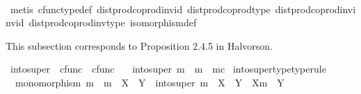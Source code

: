\begin{isabellebody}
%
\isadelimproof
\ \ %
\endisadelimproof
%
\isatagproof
{}\isamarkupfalse%
\ {\isacharparenleft}{\kern0pt}metis\ cfunc{\isacharunderscore}{\kern0pt}type{\isacharunderscore}{\kern0pt}def\ dist{\isacharunderscore}{\kern0pt}prod{\isacharunderscore}{\kern0pt}coprod{}{\isacharunderscore}{\kern0pt}inv{}{\isacharunderscore}{\kern0pt}id\ dist{\isacharunderscore}{\kern0pt}prod{\isacharunderscore}{\kern0pt}coprod{}{\isacharunderscore}{\kern0pt}type\ dist{\isacharunderscore}{\kern0pt}prod{\isacharunderscore}{\kern0pt}coprod{\isacharunderscore}{\kern0pt}inv{}{\isacharunderscore}{\kern0pt}inv{\isacharunderscore}{\kern0pt}id\ dist{\isacharunderscore}{\kern0pt}prod{\isacharunderscore}{\kern0pt}coprod{\isacharunderscore}{\kern0pt}inv{}{\isacharunderscore}{\kern0pt}type\ isomorphism{\isacharunderscore}{\kern0pt}def{\isacharparenright}{\kern0pt}%
\endisatagproof
{\isafoldproof}%
%
\isadelimproof
%
\endisadelimproof
%
\isadelimdocument
%
\endisadelimdocument
%
\isatagdocument
%
\isamarkuptrue%
%
\isamarkuptrue%
%
\endisatagdocument
{\isafolddocument}%
%
\isadelimdocument
%
\endisadelimdocument
%
\begin{isamarkuptext}%
This subsection corresponds to Proposition 2.4.5 in Halvorson.%
\end{isamarkuptext}\isamarkuptrue%
\isamarkupfalse%
\ into{\isacharunderscore}{\kern0pt}super\ {\isacharcolon}{\kern0pt}{\isacharcolon}{\kern0pt}\ {\isachardoublequoteopen}cfunc\ {\isasymRightarrow}\ cfunc{\isachardoublequoteclose}\ \isanewline
\ \ {\isachardoublequoteopen}into{\isacharunderscore}{\kern0pt}super\ m\ {\isacharequal}{\kern0pt}\ m\ {\isasymamalg}\ m\isactrlsup c{\isachardoublequoteclose}\isanewline
\isanewline
{}\isamarkupfalse%
\ into{\isacharunderscore}{\kern0pt}super{\isacharunderscore}{\kern0pt}type{\isacharbrackleft}{\kern0pt}type{\isacharunderscore}{\kern0pt}rule{\isacharbrackright}{\kern0pt}{\isacharcolon}{\kern0pt}\isanewline
\ \ {\isachardoublequoteopen}monomorphism\ m\ {\isasymLongrightarrow}\ m\ {\isacharcolon}{\kern0pt}\ X\ {\isasymrightarrow}\ Y\ {\isasymLongrightarrow}\ into{\isacharunderscore}{\kern0pt}super\ m\ {\isacharcolon}{\kern0pt}\ X\ {\isasymCoprod}\ {\isacharparenleft}{\kern0pt}Y\ {\isasymsetminus}\ {\isacharparenleft}{\kern0pt}X{\isacharcomma}{\kern0pt}m{\isacharparenright}{\kern0pt}{\isacharparenright}{\kern0pt}\ {\isasymrightarrow}\ Y{\isachardoublequoteclose}\isanewline

\end{isabellebody}
